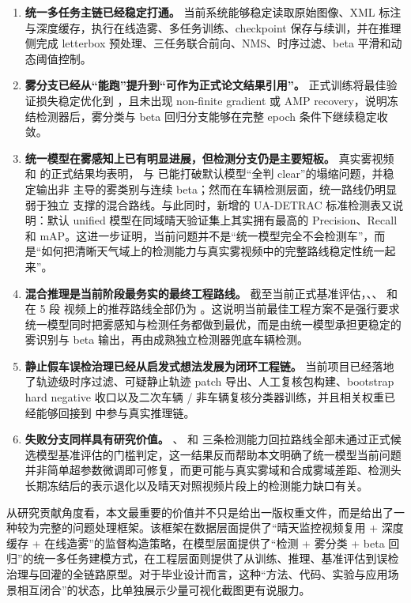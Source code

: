 \begin{enumerate}[leftmargin=2.5em]
\item \textbf{统一多任务主链已经稳定打通。} 当前系统能够稳定读取原始图像、XML 标注与深度缓存，执行在线造雾、多任务训练、checkpoint 保存与续训，并在推理侧完成 letterbox 预处理、三任务联合前向、NMS、时序过滤、beta 平滑和动态阈值控制。
\item \textbf{雾分支已经从“能跑”提升到“可作为正式论文结果引用”。}  正式训练将最佳验证损失稳定优化到 ，且未出现 non-finite gradient 或 AMP recovery，说明冻结检测器后，雾分类与 beta 回归分支能够在完整 epoch 条件下继续稳定收敛。
\item \textbf{统一模型在雾感知上已有明显进展，但检测分支仍是主要短板。} 真实雾视频和  的正式结果均表明， 与  已能打破默认模型“全判 clear”的塌缩问题，并稳定输出非  主导的雾类别与连续 beta；然而在车辆检测层面，统一路线仍明显弱于独立  支撑的混合路线。与此同时，新增的 UA-DETRAC 标准检测表又说明：默认 unified 模型在同域晴天验证集上其实拥有最高的 Precision、Recall 和 mAP。这进一步证明，当前问题并不是“统一模型完全不会检测车”，而是“如何把清晰天气域上的检测能力与真实雾视频中的完整路线稳定性统一起来”。
\item \textbf{混合推理是当前阶段最务实的最终工程路线。} 截至当前正式基准评估，、、 和  在 5 段  视频上的推荐路线全部仍为 。这说明当前最佳工程方案不是强行要求统一模型同时把雾感知与检测任务都做到最优，而是由统一模型承担更稳定的雾识别与 beta 输出，再由成熟独立检测器兜底车辆检测。
\item \textbf{静止假车误检治理已经从启发式想法发展为闭环工程链。} 当前项目已经落地了轨迹级时序过滤、可疑静止轨迹 patch 导出、人工复核包构建、bootstrap hard negative 收口以及二次车辆 / 非车辆复核分类器训练，并且相关权重已经能够回接到  中参与真实推理链。
\item \textbf{失败分支同样具有研究价值。} 、 和  三条检测能力回拉路线全部未通过正式候选模型基准评估的门槛判定，这一结果反而帮助本文明确了统一模型当前问题并非简单超参数微调即可修复，而更可能与真实雾域和合成雾域差距、检测头长期冻结后的表示退化以及晴天对照视频片段上的检测能力缺口有关。
\end{enumerate}

从研究贡献角度看，本文最重要的价值并不只是给出一版权重文件，而是给出了一种较为完整的问题处理框架。该框架在数据层面提供了“晴天监控视频复用 + 深度缓存 + 在线造雾”的监督构造策略，在模型层面提供了“检测 + 雾分类 + beta 回归”的统一多任务建模方式，在工程层面则提供了从训练、推理、基准评估到误检治理与回灌的全链路原型。对于毕业设计而言，这种“方法、代码、实验与应用场景相互闭合”的状态，比单独展示少量可视化截图更有说服力。

